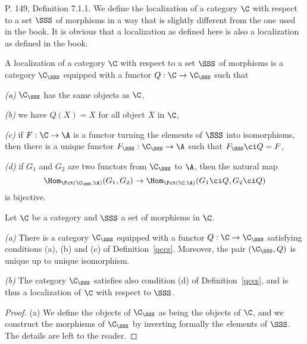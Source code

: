 \documentclass[12pt]{article}
\theoremstyle{remark}
\theoremstyle{definition}
\begin{document}
\begin{s}
P. 149, Definition 7.1.1. We define the localization of a category $\C$ with respect to a set $\SSS$ of morphisms in a way that is slightly different from the one used in the book. It is obvious that a localization as defined here is also a localization as defined in the book.
\begin{df}
A localization of a category $\C$ with respect to a set $\SSS$ of morphisms is a category $\C_\SSS$ equipped with a functor $Q:\C\to\C_\SSS$ such that 

\nn\emph{(a)} $\C_\SSS$ has the same objects as $\C$,

\nn\emph{(b)} we have $Q(X)=X$ for all object $X$ in $\C$,

\nn\emph{(c)} if $F:\C\to\A$ is a functor turning the elements of $\SSS$ into isomorphisms, then there is a unique functor $F_\SSS:\C_\SSS\to\A$ such that $F_\SSS\ci Q=F$,

\nn\emph{(d)} if $G_1$ and $G_2$ are two functors from $\C_\SSS$ to $\A$, then the natural map 
$$
\Hom_{\Fct(\C_\SSS,\A)}(G_1,G_2)\to\Hom_{\Fct(\C,\A)}(G_1\ci Q,G_2\ci Q)
$$
is bijective.
\end{df}
\begin{prop}
Let $\C$ be a category and $\SSS$ a set of morphisms in $\C$.

\nn\emph{(a)} There is a category $\C_\SSS$ equipped with a functor $Q:\C\to\C_\SSS$ satisfying conditions (a), (b) and (c) of Definition~\ref{qccs}. Moreover, the pair $(\C_\SSS,Q)$ is unique up to unique isomorphism. 

\nn\emph{(b)} The category $\C_\SSS$ satisfies also condition (d) of Definition~\ref{qccs}, and is thus a localization of $\C$ with respect to $\SSS$.
\end{prop}
\begin{proof}
(a) We define the objects of $\C_\SSS$ as being the objects of $\C$, and we construct the morphisms of $\C_\SSS$ by inverting formally the elements of $\SSS$. The details are left to the reader.


\end{proof}
\end{s}
\end{document}
